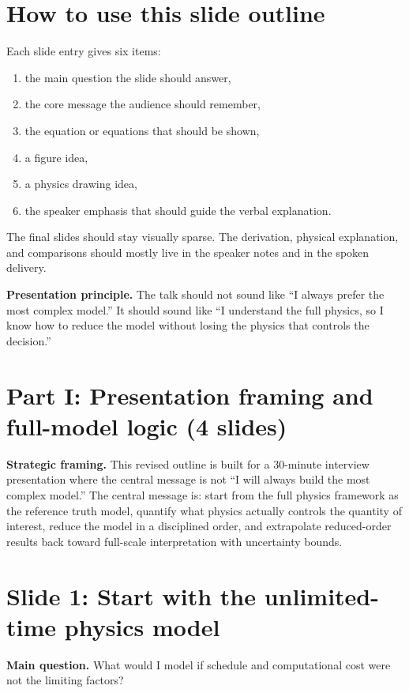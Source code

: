 \documentclass[11pt]{article}
\begin{document}
\section{How to use this slide outline}
Each slide entry gives six items:
\begin{enumerate}[leftmargin=1.6em]
    \item the main question the slide should answer,
    \item the core message the audience should remember,
    \item the equation or equations that should be shown,
    \item a figure idea,
    \item a physics drawing idea,
    \item the speaker emphasis that should guide the verbal explanation.
\end{enumerate}
The final slides should stay visually sparse. The derivation, physical explanation, and comparisons should mostly live in the speaker notes and in the spoken delivery.

\begin{notebox}
\textbf{Presentation principle.} The talk should not sound like ``I always prefer the most complex model.'' It should sound like ``I understand the full physics, so I know how to reduce the model without losing the physics that controls the decision.''
\end{notebox}

\section{Part I: Presentation framing and full-model logic (4 slides)}

\begin{notebox}
\textbf{Strategic framing.} This revised outline is built for a 30-minute interview presentation where the central message is not ``I will always build the most complex model.'' The central message is: start from the full physics framework as the reference truth model, quantify what physics actually controls the quantity of interest, reduce the model in a disciplined order, and extrapolate reduced-order results back toward full-scale interpretation with uncertainty bounds.
\end{notebox}

\section{Slide 1: Start with the unlimited-time physics model}
\begin{physicsbox}
\textbf{Main question.} What would I model if schedule and computational cost were not the limiting factors?
\end{physicsbox}
\end{document}
